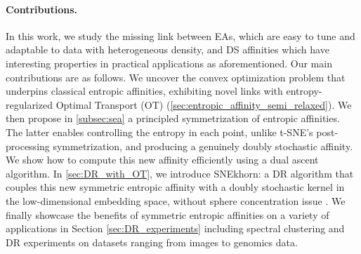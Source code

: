\paragraph{Contributions.} In this work, we study the missing
link between EAs, which are easy to tune and adaptable to data with heterogeneous density, and DS affinities which have interesting properties in practical applications as aforementioned. 
Our main contributions are as follows. We uncover the convex
optimization problem that underpins classical entropic affinities, exhibiting
novel links with entropy-regularized Optimal Transport (OT) (\cref{sec:entropic_affinity_semi_relaxed}). We then propose in \cref{subsec:sea} a principled symmetrization of entropic
affinities. The latter enables controlling the entropy in each point, unlike
t-SNE's post-processing symmetrization, and producing a genuinely doubly stochastic affinity. We show how to
compute this new affinity efficiently using a dual ascent algorithm.
In \cref{sec:DR_with_OT}, we introduce SNEkhorn: a DR algorithm that couples this new symmetric entropic affinity with a doubly stochastic kernel in the low-dimensional embedding space, without sphere concentration issue \cite{lu2019doubly}. We finally showcase the benefits of symmetric entropic affinities on a variety of applications in Section \ref{sec:DR_experiments} including spectral clustering and DR experiments on datasets ranging from images to genomics data.